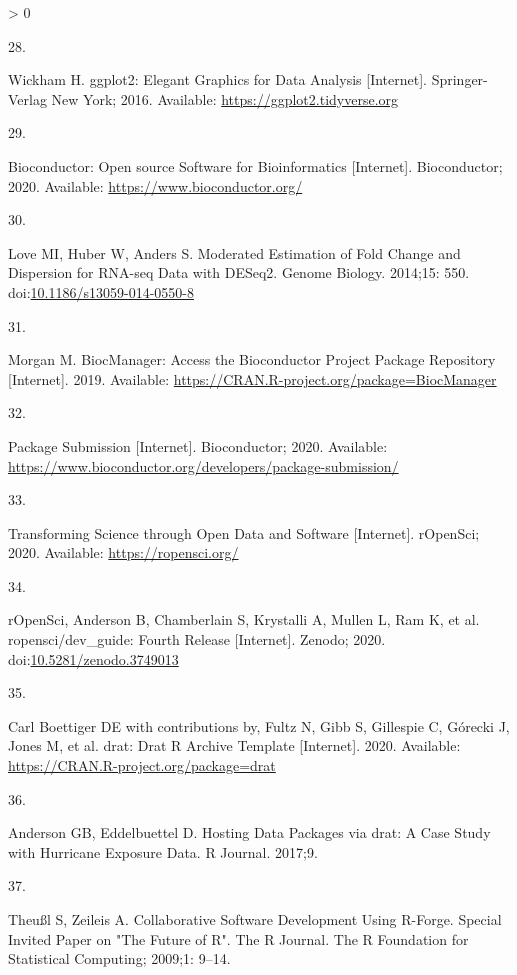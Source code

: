 \documentclass[10pt,letterpaper]{article}
\newlength{\csllabelwidth}
\newlength{\cslhangindent}
\newenvironment{CSLReferences}[3] %
 {%
  \setlength{\parindent}{0pt}
  \ifodd #1 \everypar{\setlength{\hangindent}{\cslhangindent}}\ignorespaces\fi
  \ifnum #2 > 0
  \setlength{\parskip}{#2\baselineskip}
  \fi
 }%
 {}
\newcommand{\CSLLeftMargin}[1]{\parbox[t]{\csllabelwidth}{#1}}
\newcommand{\CSLRightInline}[1]{\parbox[t]{\linewidth - \csllabelwidth}{#1}}
\begin{document}
\begin{CSLReferences}{0}{0}
\leavevmode\hypertarget{ref-ggplot2}{}%
\CSLLeftMargin{28. }
\CSLRightInline{Wickham H. {ggplot2: Elegant Graphics for Data Analysis}
{[}Internet{]}. Springer-Verlag New York; 2016. Available:
\url{https://ggplot2.tidyverse.org}}

\leavevmode\hypertarget{ref-bioconductor}{}%
\CSLLeftMargin{29. }
\CSLRightInline{{Bioconductor: Open source Software for Bioinformatics}
{[}Internet{]}. Bioconductor; 2020. Available:
\url{https://www.bioconductor.org/}}

\leavevmode\hypertarget{ref-DESeq2}{}%
\CSLLeftMargin{30. }
\CSLRightInline{Love MI, Huber W, Anders S. {Moderated Estimation of
Fold Change and Dispersion for RNA-seq Data with DESeq2}. Genome
Biology. 2014;15: 550.
doi:\href{https://doi.org/10.1186/s13059-014-0550-8}{10.1186/s13059-014-0550-8}}

\leavevmode\hypertarget{ref-BiocManager}{}%
\CSLLeftMargin{31. }
\CSLRightInline{Morgan M. {BiocManager: Access the Bioconductor Project
Package Repository} {[}Internet{]}. 2019. Available:
\url{https://CRAN.R-project.org/package=BiocManager}}

\leavevmode\hypertarget{ref-biocpkgsub2020}{}%
\CSLLeftMargin{32. }
\CSLRightInline{{Package Submission} {[}Internet{]}. Bioconductor; 2020.
Available:
\url{https://www.bioconductor.org/developers/package-submission/}}

\leavevmode\hypertarget{ref-ropensci2020}{}%
\CSLLeftMargin{33. }
\CSLRightInline{{Transforming Science through Open Data and Software}
{[}Internet{]}. rOpenSci; 2020. Available: \url{https://ropensci.org/}}

\leavevmode\hypertarget{ref-ropenscidev2020}{}%
\CSLLeftMargin{34. }
\CSLRightInline{rOpenSci, Anderson B, Chamberlain S, Krystalli A, Mullen
L, Ram K, et al. {ropensci/dev\_guide: Fourth Release} {[}Internet{]}.
Zenodo; 2020.
doi:\href{https://doi.org/10.5281/zenodo.3749013}{10.5281/zenodo.3749013}}

\leavevmode\hypertarget{ref-drat}{}%
\CSLLeftMargin{35. }
\CSLRightInline{Carl Boettiger DE with contributions by, Fultz N, Gibb
S, Gillespie C, Górecki J, Jones M, et al. {drat: Drat R Archive
Template} {[}Internet{]}. 2020. Available:
\url{https://CRAN.R-project.org/package=drat}}

\leavevmode\hypertarget{ref-anderson2017}{}%
\CSLLeftMargin{36. }
\CSLRightInline{Anderson GB, Eddelbuettel D. {Hosting Data Packages via
drat: A Case Study with Hurricane Exposure Data}. R Journal. 2017;9. }

\leavevmode\hypertarget{ref-theussl2009}{}%
\CSLLeftMargin{37. }
\CSLRightInline{Theußl S, Zeileis A. {Collaborative Software Development
Using R-Forge. Special Invited Paper on "The Future of R"}. The R
Journal. The R Foundation for Statistical Computing; 2009;1: 9--14. }


\end{CSLReferences}
\end{document}
